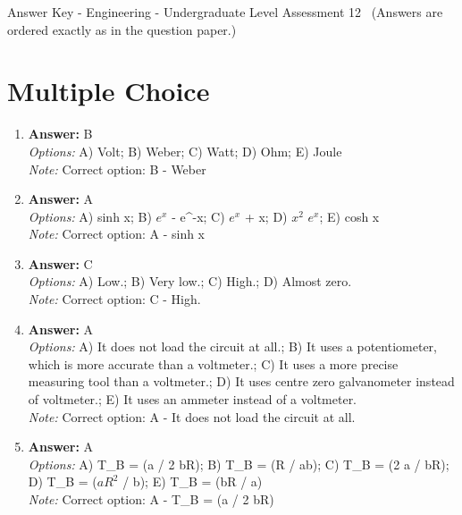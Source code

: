 \documentclass[12pt]{article}
\begin{document}
\begin{center}
Answer Key - Engineering - Undergraduate Level Assessment 12 \
\small (Answers are ordered exactly as in the question paper.)
\end{center}

\section*{Multiple Choice}
\begin{enumerate}[label=\arabic*.]
\item \textbf{Answer:} B
\\ \textit{Options:} A) Volt; B) Weber; C) Watt; D) Ohm; E) Joule
\\ \textit{Note:} Correct option: B - Weber
\item \textbf{Answer:} A
\\ \textit{Options:} A) sinh x; B) $e^x$ - e^-x; C) $e^x$ + x; D) $x^2$ $e^x$; E) cosh x
\\ \textit{Note:} Correct option: A - sinh x
\item \textbf{Answer:} C
\\ \textit{Options:} A) Low.; B) Very low.; C) High.; D) Almost zero.
\\ \textit{Note:} Correct option: C - High.
\item \textbf{Answer:} A
\\ \textit{Options:} A) It does not load the circuit at all.; B) It uses a potentiometer, which is more accurate than a voltmeter.; C) It uses a more precise measuring tool than a voltmeter.; D) It uses centre zero galvanometer instead of voltmeter.; E) It uses an ammeter instead of a voltmeter.
\\ \textit{Note:} Correct option: A - It does not load the circuit at all.
\item \textbf{Answer:} A
\\ \textit{Options:} A) T\_B = (a / 2 bR); B) T\_B = (R / ab); C) T\_B = (2 a / bR); D) T\_B = ($aR^2$ / b); E) T\_B = (bR / a)
\\ \textit{Note:} Correct option: A - T\_B = (a / 2 bR)
\end{enumerate}
\end{document}

